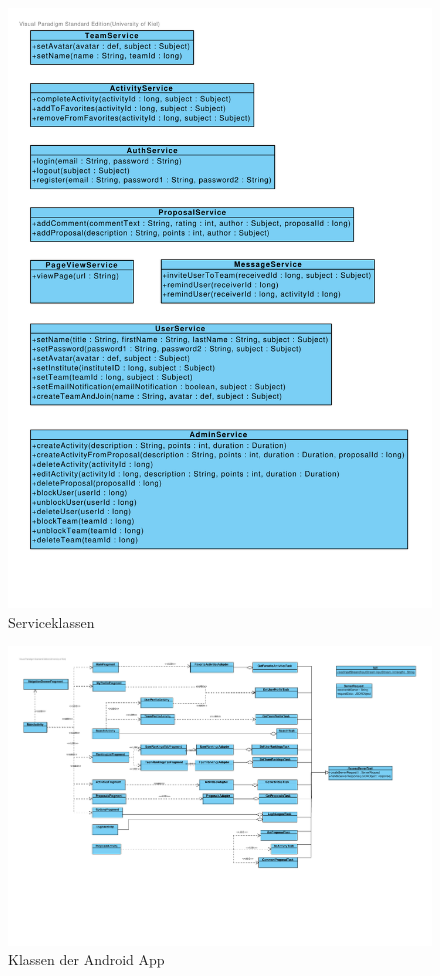 \begin{figure}[H]
  \centering
  \includegraphics[width=\textwidth, trim=1cm 1cm 1cm 1cm, clip]{gfx/service_classes}
  \caption{Serviceklassen}
\end{figure}

\begin{figure}[H]
	\centering
	\includegraphics[width=18cm, trim=1cm 7cm 1cm 1cm, clip, angle=90]{gfx/androidapp_classes}
	\caption{Klassen der Android App}
\end{figure}


